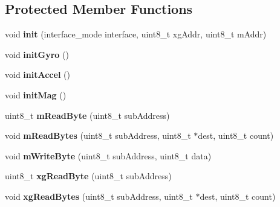 \subsection*{Protected Member Functions}
\begin{DoxyCompactItemize}
\item 
void {\bfseries init} (interface\+\_\+mode interface, uint8\+\_\+t xg\+Addr, uint8\+\_\+t m\+Addr)\hypertarget{classLSM9DS1_aa4f74e09e93c0133dc30545d4492849e}{}\label{classLSM9DS1_aa4f74e09e93c0133dc30545d4492849e}

\item 
void {\bfseries init\+Gyro} ()\hypertarget{classLSM9DS1_a66a7b02acb28964ffc9362f25988e270}{}\label{classLSM9DS1_a66a7b02acb28964ffc9362f25988e270}

\item 
void {\bfseries init\+Accel} ()\hypertarget{classLSM9DS1_a143ff5abf4f7ba8e1c42325859106f84}{}\label{classLSM9DS1_a143ff5abf4f7ba8e1c42325859106f84}

\item 
void {\bfseries init\+Mag} ()\hypertarget{classLSM9DS1_a492aa6edcf891f273d932636e3cc470d}{}\label{classLSM9DS1_a492aa6edcf891f273d932636e3cc470d}

\item 
uint8\+\_\+t {\bfseries m\+Read\+Byte} (uint8\+\_\+t sub\+Address)\hypertarget{classLSM9DS1_ae4e470321567e4f93fc09f4cc6cd9efa}{}\label{classLSM9DS1_ae4e470321567e4f93fc09f4cc6cd9efa}

\item 
void {\bfseries m\+Read\+Bytes} (uint8\+\_\+t sub\+Address, uint8\+\_\+t $\ast$dest, uint8\+\_\+t count)\hypertarget{classLSM9DS1_acfdf9862cad1e66c9fb61a17bfbe7477}{}\label{classLSM9DS1_acfdf9862cad1e66c9fb61a17bfbe7477}

\item 
void {\bfseries m\+Write\+Byte} (uint8\+\_\+t sub\+Address, uint8\+\_\+t data)\hypertarget{classLSM9DS1_afc171c924102c97fa1d88fa7f48bd167}{}\label{classLSM9DS1_afc171c924102c97fa1d88fa7f48bd167}

\item 
uint8\+\_\+t {\bfseries xg\+Read\+Byte} (uint8\+\_\+t sub\+Address)\hypertarget{classLSM9DS1_af7f9789df6f0178764c815a3380c202a}{}\label{classLSM9DS1_af7f9789df6f0178764c815a3380c202a}

\item 
void {\bfseries xg\+Read\+Bytes} (uint8\+\_\+t sub\+Address, uint8\+\_\+t $\ast$dest, uint8\+\_\+t count)\hypertarget{classLSM9DS1_ae0a9cbfd74b1f4676f091c2d8e491d77}{}\label{classLSM9DS1_ae0a9cbfd74b1f4676f091c2d8e491d77}


\end{DoxyCompactItemize}
